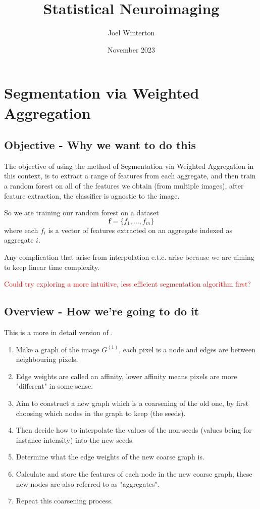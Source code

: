 \documentclass{report}
\title{Statistical Neuroimaging}
\author{Joel Winterton}
\date{November 2023}
\begin{document}
\maketitle
\tableofcontents

\chapter{Segmentation via Weighted Aggregation}

\section{Objective - Why we want to do this}
The objective of using the method of Segmentation via Weighted Aggregation in this context, is to extract a range of features from each aggregate, and then train a random forest on all of the features we obtain (from multiple images), after feature extraction, the classifier is agnostic to the image. 

So we are training our random forest on a dataset 
\[\mathbf{f} = \{f_1, ... , f_m\}\]
where each $f_i$ is a vector of features extracted on an aggregate indexed as aggregate $i$.

Any complication that arise from interpolation e.t.c. arise because we are aiming to keep linear time complexity. 

\textcolor{red}{Could try exploring a more intuitive, less efficient segmentation algorithm first?}

\section{Overview - How we're going to do it}
This is a more in detail version of \cite{sharon_galun_sharon_basri_brandt_2006}.
\begin{enumerate}

\item Make a graph of the image $G^{(1)}$, each pixel is a node and edges are between neighbouring pixels. 
\item Edge weights are called an affinity, lower affinity means pixels are more "different" in some sense.
\item Aim to construct a new graph which is a coarsening of the old one, by first choosing which nodes in the graph to keep (the seeds).
\item Then decide how to interpolate the values of the non-seeds (values being for instance intensity) into the new seeds.
\item Determine what the edge weights of the new coarse graph is. 
\item Calculate and store the features of each node in the new coarse graph, these new nodes are also referred to as "aggregates". 
\item Repeat this coarsening process. 
\end{enumerate}
\end{document}
